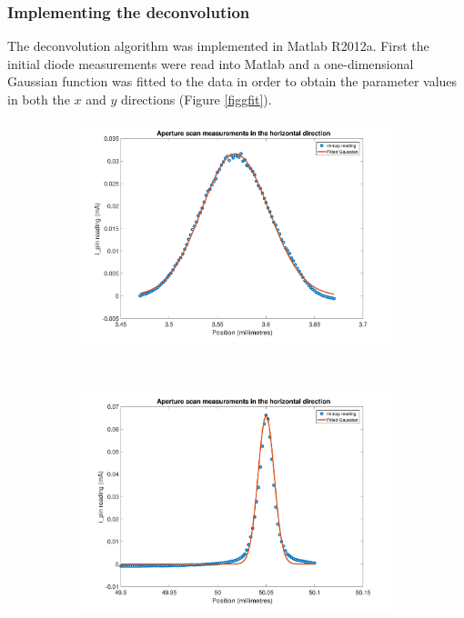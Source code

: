\subsubsection{Implementing the deconvolution}
\label{subs:Implementing the deconvolution}
The deconvolution algorithm was implemented in Matlab R2012a.
First the initial diode measurements were read into Matlab and a one-dimensional Gaussian function was fitted to the data in order to obtain the parameter values in both the $x$ and $y$ directions (Figure \ref{figgfit}).
\begin{figure}
        \centering
        \begin{subfigure}[b]{1.0\textwidth}
                \centering
                \includegraphics[width=\textwidth]{figures/beam/ApertureScans_x.pdf}
                \caption{}
                \label{figfitx}
        \end{subfigure}
				\\
        \begin{subfigure}[b]{1.0\textwidth}
                \centering
                \includegraphics[width=\textwidth]{figures/beam/ApertureScans_y.pdf}

\end{subfigure}
\end{figure}
